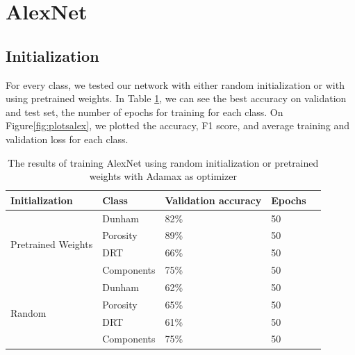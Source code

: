 
\section{AlexNet}\label{sec:aleX}
\subsection{Initialization}
For every class, we tested our network with either random initialization or with using pretrained weights. In Table \ref{tab:alexinit}, we can see the best accuracy on validation and test set, the number of epochs for training for each class.  
On Figure\ref{fig:plotsalex}, we plotted the accuracy, F1 score, and average training and validation loss for each class. 
\begin{table}
\caption{\label{tab:alexinit} The results of training AlexNet using random initialization or pretrained weights with Adamax as optimizer}
\centering
\begin{tabular}[b]{| l | l | l | l | l |}
\hline
    Initialization & Class & Validation accuracy  & Epochs\\ \hline
    \multirow{4}{*}{Pretrained Weights} & Dunham &  82\%  & 50 \\ %
    & Porosity & 89\% &  50 \\
    &DRT & 66\% &  50 \\
    &Components & 75\% &  50 \\ \hline
     \multirow{4}{*}{Random} & Dunham &  62\% & 50 \\
    & Porosity & 65\% &  50 \\
    &DRT & 61\% &  50 \\
    &Components & 75\% & 50 \\ \hline
\end{tabular} 
\end{table}

